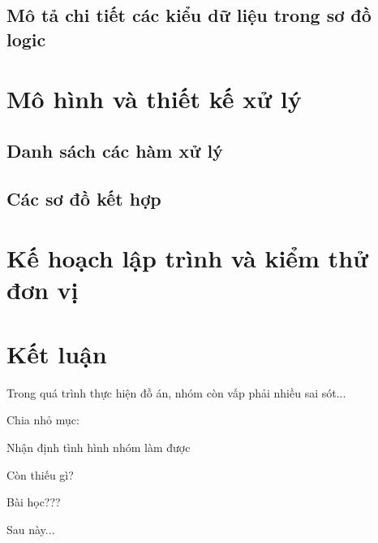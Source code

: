 \documentclass{article}
\begin{document}
	\subsection{Mô tả chi tiết các kiểu dữ liệu trong sơ đồ logic}
	
	\section{Mô hình và thiết kế xử lý}
	\subsection{Danh sách các hàm xử lý}
	\subsection{Các sơ đồ kết hợp}
	
	\section{Kế hoạch lập trình và kiểm thử đơn vị}
	
	\section{Kết luận}
	
	Trong quá trình thực hiện đồ án, nhóm còn vấp phải nhiều sai sót...
	
	
	Chia nhỏ mục:
	
	Nhận định tình hình nhóm làm được
	
	Còn thiếu gì?
	
	Bài học???
	
	Sau này...
	
\end{document}
